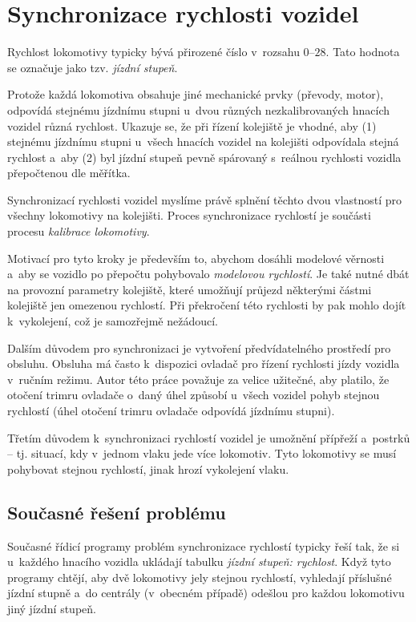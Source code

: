 \section{Synchronizace rychlosti vozidel}
\label{sec:sync-rych}

Rychlost lokomotivy typicky bývá přirozené číslo v~rozsahu $0$--$28$. Tato
hodnota se označuje jako tzv. \textit{jízdní stupeň}.

Protože každá lokomotiva obsahuje jiné mechanické prvky (převody, motor),
odpovídá stejnému jízdnímu stupni u~dvou různých nezkalibrovaných hnacích
vozidel různá rychlost. Ukazuje se, že při řízení kolejiště je vhodné, aby (1)
stejnému jízdnímu stupni u~všech hnacích vozidel na kolejišti odpovídala stejná
rychlost a~aby (2) byl jízdní stupeň pevně spárovaný s~reálnou rychlosti
vozidla přepočtenou dle měřítka.

Synchronizací rychlosti vozidel myslíme právě splnění těchto dvou vlastností
pro všechny lokomotivy na kolejišti. Proces synchronizace rychlostí je součásti
procesu \textit{kalibrace lokomotivy}.

Motivací pro tyto kroky je především to, abychom dosáhli modelové věrnosti
a~aby se vozidlo po přepočtu pohybovalo \textit{modelovou rychlostí}. Je také
nutné dbát na provozní parametry kolejiště, které umožňují průjezd některými
částmi kolejiště jen omezenou rychlostí. Při překročení této rychlosti by pak
mohlo dojít k~vykolejení, což je samozřejmě nežádoucí.

Dalším důvodem pro synchronizaci je vytvoření předvídatelného prostředí pro
obsluhu. Obsluha má často k~dispozici ovladač pro řízení rychlosti jízdy
vozidla v~ručním režimu. Autor této práce považuje za velice užitečné, aby
platilo, že otočení trimru ovladače o~daný úhel způsobí u~všech vozidel pohyb
stejnou rychlostí (úhel otočení trimru ovladače odpovídá jízdnímu stupni).

Třetím důvodem k~synchronizaci rychlostí vozidel je umožnění přípřeží a~postrků
-- tj.  situací, kdy v~jednom vlaku jede více lokomotiv. Tyto lokomotivy se
musí pohybovat stejnou rychlostí, jinak hrozí vykolejení vlaku.

\subsection{Současné řešení problému}

Současné řídicí programy problém synchronizace rychlostí typicky řeší tak, že
si u~každého hnacího vozidla ukládají tabulku \textit{jízdní stupeň: rychlost}.
Když tyto programy chtějí, aby dvě lokomotivy jely stejnou rychlostí, vyhledají
příslušné jízdní stupně a~do centrály (v~obecném případě) odešlou pro každou
lokomotivu jiný jízdní stupeň.

